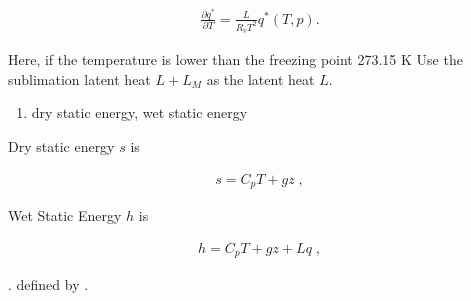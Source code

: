 \begin{eqnarray}
\frac{\partial q^*}{\partial T} = \frac{L}{R_v T^2} q^*(T,p) .
\end{eqnarray}

Here, if the temperature is lower than the freezing point 273.15 K Use
the sublimation latent heat \(L+L_M\) as the latent heat \(L\).

\begin{enumerate}
\def\labelenumi{\arabic{enumi}.}
\setcounter{enumi}{5}
\tightlist
\item
  dry static energy, wet static energy
\end{enumerate}

Dry static energy \(s\) is

\begin{eqnarray}
  s = C_p T + g z \; ,
\end{eqnarray}

Wet Static Energy \(h\) is

\begin{eqnarray}
  h = C_p T + g z + L q \; ,
\end{eqnarray}

. defined by .
